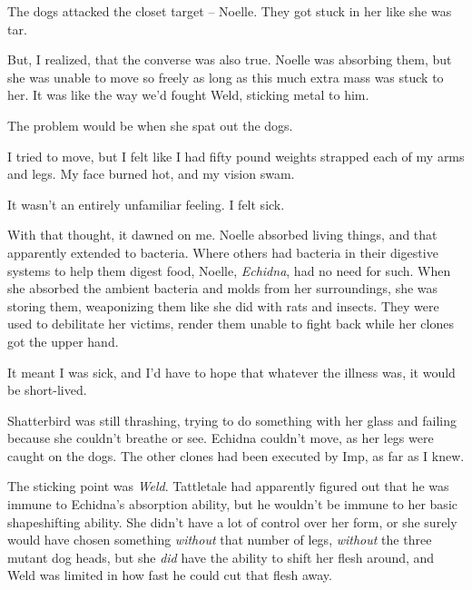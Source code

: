 The dogs attacked the closet target – Noelle.  They got stuck in her like she was tar.



But, I realized, that the converse was also true.  Noelle was absorbing them, but she was unable to move so freely as long as this much extra mass was stuck to her.  It was like the way we'd fought Weld, sticking metal to him.



The problem would be when she spat out the dogs.



I tried to move, but I felt like I had fifty pound weights strapped each of my arms and legs.  My face burned hot, and my vision swam.



It wasn't an entirely unfamiliar feeling.  I felt sick.



With that thought, it dawned on me.  Noelle absorbed living things, and that apparently extended to bacteria.  Where others had bacteria in their digestive systems to help them digest food, Noelle, \emph{Echidna}, had no need for such.  When she absorbed the ambient bacteria and molds from her surroundings, she was storing them, weaponizing them like she did with rats and insects.  They were used to debilitate her victims, render them unable to fight back while her clones got the upper hand.



It meant I was sick, and I'd have to hope that whatever the illness was, it would be short-lived.



Shatterbird was still thrashing, trying to do something with her glass and failing because she couldn't breathe or see.  Echidna couldn't move, as her legs were caught on the dogs.  The other clones had been executed by Imp, as far as I knew.



The sticking point was \emph{Weld}.  Tattletale had apparently figured out that he was immune to Echidna's absorption ability, but he wouldn't be immune to her basic shapeshifting ability.  She didn't have a lot of control over her form, or she surely would have chosen something \emph{without }that number of legs, \emph{without} the three mutant dog heads, but she \emph{did} have the ability to shift her flesh around, and Weld was limited in how fast he could cut that flesh away.




